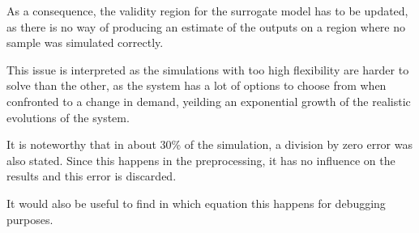 
As a consequence, the validity region for the surrogate model has to be updated, as there is no way of producing an estimate of the outputs on a region where no sample was simulated correctly.

This issue is interpreted as the simulations with too high flexibility are harder to solve than the other, as the system has a lot of options to choose from when confronted to a change in demand, yeilding an exponential growth of the realistic evolutions of the system.

It is noteworthy that in about 30\% of the simulation, a division by zero error was also stated. Since this happens in the preprocessing, it has no influence on the results and this error is discarded.

It would also be useful to find in which equation this happens for debugging purposes.



